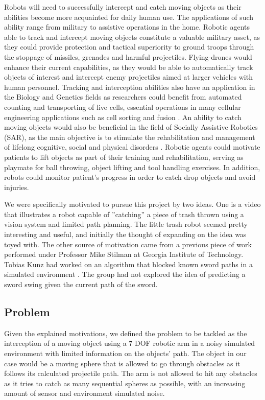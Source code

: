 \documentclass[letterpaper, 10 pt, conference]{ieeeconf}  %
\begin{document}
Robots will need to successfully intercept and catch moving objects as their
abilities become more acquainted for daily human use. The applications of such
ability range from military to assistive operations in the home. Robotic agents
able to track and intercept moving objects constitute a valuable military
asset, as they could provide protection and tactical superiority to ground
troops through the stoppage of missiles, grenades and harmful projectiles.
Flying-drones would enhance their current capabilities, as they would be able
to automatically track objects of interest and intercept enemy projectiles
aimed at larger vehicles with human personnel.  Tracking and interception
abilities also have an application in the Biology and Genetics fields as
researchers could benefit from automated counting and transporting of live
cells, essential operations in many cellular engineering applications such as
cell sorting and fusion \cite{5985660}. An ability to catch moving objects
would also be beneficial in the field of Socially Assistive Robotics (SAR), as
the main objective is to stimulate the rehabilitation and management of
lifelong cognitive, social and physical disorders \cite{5569021}. Robotic
agents could motivate patients to lift objects as part of their training and
rehabilitation, serving as playmate for ball throwing, object lifting and tool
handling exercises. In addition, robots could monitor patient's progress in
order to catch drop objects and avoid injuries.

We were specifically motivated to pursue this project by two ideas. One is a
video that illustrates a robot capable of ”catching” a piece of trash thrown
using a vision system and limited path planning. The little trash robot seemed
pretty interesting and useful, and initially the thought of expanding on the
idea was toyed with. The other source of motivation came from a previous piece
of work performed under Professor Mike Stilman at Georgia Institute of
Technology. Tobias Kunz had worked on an algorithm that blocked known sword
paths in a simulated environment \cite{lampariello2011trajectory}. The group
had not explored the idea of predicting a sword swing given the current path of
the sword.

\subsection{Problem}

Given the explained motivations, we defined the problem to be tackled as the
interception of a moving object using a 7 DOF robotic arm in a noisy simulated
environment with limited information on the objects’ path. The object in our
case would be a moving sphere that is allowed to go through obstacles as it
follows its calculated projectile path. The arm is not allowed to hit any
obstacles as it tries to catch as many sequential spheres as possible, with an
increasing amount of sensor and environment simulated noise.
\end{document}
